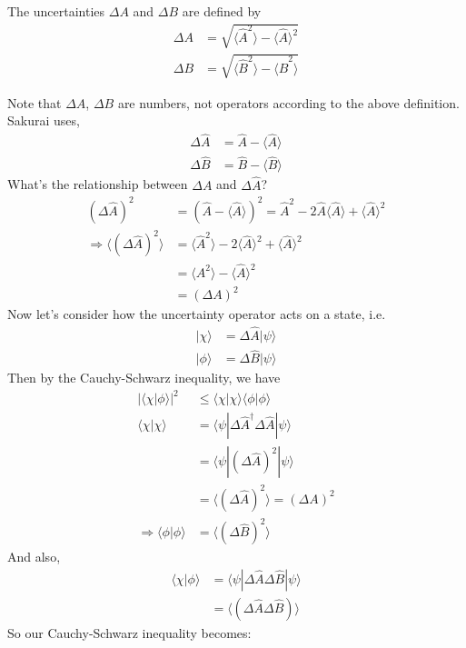 \documentclass[a4paper, 11pt]{article}
\newcommand{\ket}[1]{|#1\rangle}
\newcommand{\bra}[1]{\langle #1 |}
\newcommand{\braket}[2]{\langle #1 | #2 \rangle}
\newcommand{\expect}[1]{\langle #1 \rangle}
\begin{document}
	\noindent The uncertainties $\Delta A$ and $\Delta B$ are defined by 
		\begin{align}
			\Delta A &= \sqrt{\expect{\hat{A}^2}-\expect{\hat{A}}^2} \\
			\Delta B &= \sqrt{\expect{\hat{B}^2}-\expect{\hat{B}^2}}
		\end{align}
		
	\noindent Note that $\Delta A$, $\Delta B$ are numbers, not operators according to the above definition. Sakurai uses, 
		\begin{align}
			\Delta \hat{A} &= \hat{A}-\expect{\hat{A}} \\ 
			\Delta \hat{B} &= \hat{B}-\expect{\hat{B}} 
		\end{align}
	What's the relationship between $\Delta A$ and $\Delta\hat{A}$? 
		\begin{align*}
			(\Delta\hat{A})^2 &= (\hat{A}-\expect{\hat{A}})^2 = \hat{A}^2-2\hat{A}\expect{\hat{A}} + \expect{\hat{A}}^2 \\ 
			\Rightarrow \expect{(\Delta \hat{A})^2} &= \expect{\hat{A}^2} - 2\expect{\hat{A}}^2 + \expect{\hat{A}}^2 \\ 
			&= \expect{A^2}-\expect{\hat{A}}^2 \\ 
			&= (\Delta A)^2
		\end{align*}
	Now let's consider how the uncertainty operator acts on a state, i.e. 
		\begin{align*}
			\ket{\chi} &= \Delta\hat{A}\ket{\psi} \\ 
			\ket{\phi} &= \Delta\hat{B}\ket{\psi} 
		\end{align*}
	Then by the Cauchy-Schwarz inequality, we have 
		\begin{align*}
			|\braket{\chi}{\phi}|^2 &\leq \braket{\chi}{\chi}\braket{\phi}{\phi} \\ 
			\braket{\chi}{\chi} &= \bra{\psi}\Delta\hat{A}^\dagger \Delta\hat{A}\ket{\psi} \\ 
			&= \bra{\psi}(\Delta \hat{A})^2 \ket{\psi} \\ 
			&= \expect{(\Delta \hat{A})^2} = (\Delta A)^2 \\ 
			\Rightarrow \braket{\phi}{\phi} &= \expect{(\Delta \hat{B})^2} 
		\end{align*}
	And also, 
		\begin{align*}
			\braket{\chi}{\phi} &= \bra{\psi}\Delta\hat{A}\Delta\hat{B}\ket{\psi} \\ 
				&= \expect{(\Delta\hat{A}\Delta\hat{B})}
		\end{align*}
	So our Cauchy-Schwarz inequality becomes: 
\end{document}
